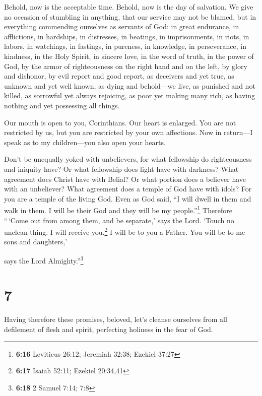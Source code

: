 Behold, now is the acceptable time. Behold, now is the day of salvation.
 We give no occasion of stumbling in anything, that our
service may not be blamed,  but in everything commending
ourselves as servants of God: in great endurance, in afflictions, in
hardships, in distresses,  in beatings, in imprisonments,
in riots, in labors, in watchings, in fastings,  in
pureness, in knowledge, in perseverance, in kindness, in the Holy
Spirit, in sincere love,  in the word of truth, in the
power of God, by the armor of righteousness on the right hand and on the
left,  by glory and dishonor, by evil report and good
report, as deceivers and yet true,  as unknown and yet
well known, as dying and behold---we live, as punished and not killed,
 as sorrowful yet always rejoicing, as poor yet making
many rich, as having nothing and yet possessing all things.

 Our mouth is open to you, Corinthians. Our heart is
enlarged.  You are not restricted by us, but you are
restricted by your own affections.  Now in return---I
speak as to my children---you also open your hearts.

 Don't be unequally yoked with unbelievers, for what
fellowship do righteousness and iniquity have? Or what fellowship does
light have with darkness?  What agreement does Christ
have with Belial? Or what portion does a believer have with an
unbeliever?  What agreement does a temple of God have
with idols? For you are a temple of the living God. Even as God said,
``I will dwell in them and walk in them. I will be their God and they
will be my people.''\footnote{\textbf{6:16} Leviticus 26:12; Jeremiah
  32:38; Ezekiel 37:27}  Therefore ``\,`Come out from
among them, and be separate,' says the Lord. `Touch no unclean thing. I
will receive you.\footnote{\textbf{6:17} Isaiah 52:11; Ezekiel 20:34,41}
 I will be to you a Father. You will be to me sons and
daughters,'

says the Lord Almighty.''\footnote{\textbf{6:18} 2 Samuel 7:14; 7:8}

\hypertarget{section-6}{%
\section{7}\label{section-6}}

 Having therefore these promises, beloved, let's cleanse
ourselves from all defilement of flesh and spirit, perfecting holiness
in the fear of God.

